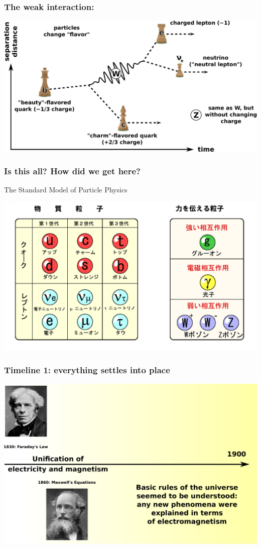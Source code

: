 \documentclass[compress]{beamer}
\begin{document}
\begin{frame}
\frametitle{The weak interaction:}
\includegraphics[width=\linewidth]{weakinteraction.pdf}
\end{frame}

\begin{frame}
\frametitle{Is this all?  How did we get here?}
\begin{center}
\large The Standard Model of Particle Physics
\end{center}
\includegraphics[width=\linewidth]{standard_model.png}
\end{frame}

\begin{frame}
\frametitle{Timeline 1: everything settles into place}
\includegraphics[width=\linewidth]{timeline1.pdf}
\end{frame}
\end{document}
